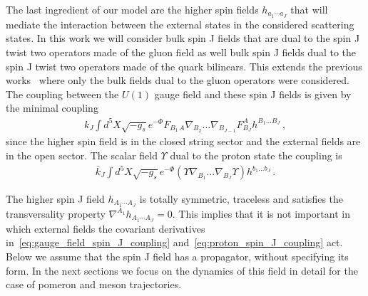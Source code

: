 \documentclass[a4paper,12pt]{article}
\begin{document}
The last ingredient of our model are the higher spin fields $h_{a_1 \cdots a_J}$ that will mediate the interaction between the external states in the considered scattering states. In this work we will consider bulk spin J fields that are dual to the spin J twist two operators made of the gluon field as well bulk spin J fields dual to the spin J twist two operators made of the quark bilinears. This extends the previous works~\cite{Ballon-Bayona:2015wra, ballon_bayona_unity_2017, Amorim:2018yod} where only the bulk fields dual to the gluon operators were considered. The coupling between the $U(1)$ gauge field and these spin J fields is given by the minimal coupling
\begin{align}
k_J \int d^5X \sqrt{-g_s} e^{-\Phi} F_{B_1 \, A} \nabla_{B_2} \dots \nabla_{B_{J-1}} F^A_{B_J} h^{B_1 \dots B_J} \, ,
\label{eq:gauge_field_spin_J_coupling}
\end{align}
since the higher spin field is in the closed string sector and the external fields are in the open sector.
The scalar field $\Upsilon$ dual to the proton state the coupling is
\begin{align}
\bar{k}_J \int d^5 X \sqrt{-g_s} e^{-\Phi} \left( \Upsilon \nabla_{B_1} \dots \nabla_{B_J} \Upsilon \right) h^{b_1 \dots b_J} \, .
\label{eq:proton_spin_J_coupling}
\end{align}

The higher spin J field $h_{A_1 \cdots A_J}$ is totally symmetric, traceless and satisfies the transversality property $\nabla^{A_1} h_{A_1 \cdots A_J} = 0$. This implies that it is not important in which external fields the covariant derivatives in~\ref{eq:gauge_field_spin_J_coupling} and~\ref{eq:proton_spin_J_coupling} act. 
Below we assume that the spin J field has a propagator, without specifying its form. In the next sections we focus on the dynamics of this field in detail for the case of pomeron and meson trajectories.
\end{document}
